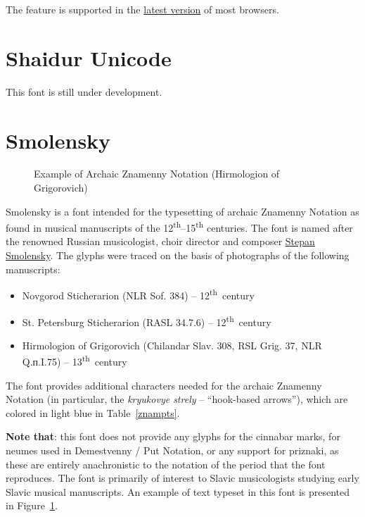 \documentclass[11pt]{article}
\let\cuKrukFont=\musicFont
\begin{document}
The feature is supported in the 
\href{https://caniuse.com/#search=font-feature-settings}{latest version} of most browsers.

\section{Shaidur Unicode}

This font is still under development.

\section{Smolensky}

\begin{figure}[tb]
\centering
\begin{minipage}{0.75\textwidth}
\begin{churchslavonic}
\archaic
\noindent
\let\cuKrukFont=\smol
{}
\end{churchslavonic}
\end{minipage}
\caption{Example of Archaic Znamenny Notation (Hirmologion of Grigorovich) \label{smolensky}}
\end{figure}

Smolensky is a font intended for the typesetting of archaic Znamenny Notation
as found in musical manuscripts of the 12\textsuperscript{th}--15\textsuperscript{th}
centuries. The font is named after the renowned Russian musicologist,
choir director and composer
\href{https://en.wikipedia.org/wiki/Stepan_Smolensky}{Stepan Smolensky}.
The glyphs were traced on the basis of photographs of the following manuscripts:

\begin{itemize}
\item Novgorod Sticherarion (NLR Sof. 384) -- 12\textsuperscript{th}~century
\item St. Petersburg Sticherarion (RASL 34.7.6) -- 12\textsuperscript{th}~century
\item Hirmologion of Grigorovich (Chilandar Slav. 308, RSL Grig. 37, NLR Q.п.I.75) -- 13\textsuperscript{th}~century
\end{itemize}

\noindent The font provides additional characters needed for the archaic Znamenny
Notation (in particular, the \emph{kryukovye strely} -- ``hook-based arrows''), which
are colored in light blue in Table~\ref{znampts}.

\textbf{Note that}: this font does not provide any glyphs for the cinnabar marks,
for neumes used in Demestvenny / Put Notation, or any support for priznaki, as these
are entirely anachronistic to the notation of the period that the font reproduces.
The font is primarily of interest to Slavic musicologists studying early
Slavic musical manuscripts. 
An example of text typeset in this font is presented in Figure~\ref{smolensky}.
\end{document}

